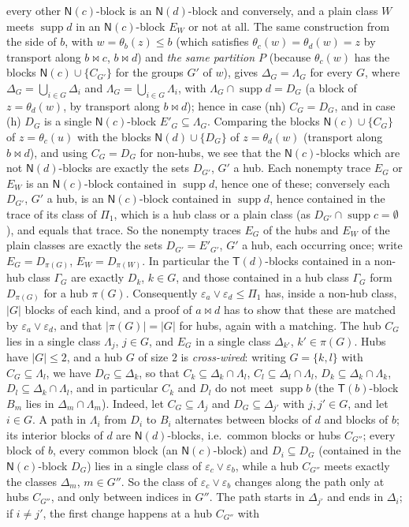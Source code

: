 \documentclass[11pt]{amsart}
\theoremstyle{definition}
\newcommand{\supp}{\operatorname{supp}}
\newcommand{\T}{\mathsf{T}}
\newcommand{\N}{\mathsf{N}}
\begin{document}
every other $\N(c)$-block is an $\N(d)$-block and conversely, and a plain class $W$ meets $\supp d$ in an $\N(c)$-block $E_W$ or not at all. The same construction from the side of $b$, with $w=\theta_b(z)\le b$ (which satisfies $\theta_c(w)=\theta_d(w)=z$ by transport along $b\bowtie c$, $b\bowtie d$) and \emph{the same partition $P$} (because $\theta_c(w)$ has the blocks $\N(c)\cup\{C_{G'}\}$ for the groups $G'$ of $w$), gives $\Delta_G=\Lambda_G$ for every $G$, where $\Delta_G=\bigcup_{i\in G}\Delta_i$ and $\Lambda_G=\bigcup_{i\in G}\Lambda_i$, with $\Lambda_G\cap\supp d=D_G$ (a block of $z=\theta_d(w)$, by transport along $b\bowtie d$); hence in case (nh) $C_G=D_G$, and in case (h) $D_G$ is a single $\N(c)$-block $E'_G\subseteq\Lambda_G$. Comparing the blocks $\N(c)\cup\{C_G\}$ of $z=\theta_c(u)$ with the blocks $\N(d)\cup\{D_G\}$ of $z=\theta_d(w)$ (transport along $b\bowtie d$), and using $C_G=D_G$ for non-hubs, we see that the $\N(c)$-blocks which are not $\N(d)$-blocks are exactly the sets $D_{G'}$, $G'$ a hub. Each nonempty trace $E_G$ or $E_W$ is an $\N(c)$-block contained in $\supp d$, hence one of these; conversely each $D_{G'}$, $G'$ a hub, is an $\N(c)$-block contained in $\supp d$, hence contained in the trace of its class of $\Pi_1$, which is a hub class or a plain class (as $D_{G'}\cap\supp c=\emptyset$), and equals that trace. So the nonempty traces $E_G$ of the hubs and $E_W$ of the plain classes are exactly the sets $D_{G'}=E'_{G'}$, $G'$ a hub, each occurring once; write $E_G=D_{\pi(G)}$, $E_W=D_{\pi(W)}$. In particular the $\T(d)$-blocks contained in a non-hub class $\Gamma_G$ are exactly $D_k$, $k\in G$, and those contained in a hub class $\Gamma_G$ form $D_{\pi(G)}$ for a hub $\pi(G)$. Consequently $\varepsilon_a\vee\varepsilon_d\le\Pi_1$ has, inside a non-hub class, $|G|$ blocks of each kind, and a proof of $a\bowtie d$ has to show that these are matched by $\varepsilon_a\vee\varepsilon_d$, and that $|\pi(G)|=|G|$ for hubs, again with a matching. The hub $C_G$ lies in a single class $\Lambda_j$, $j\in G$, and $E_G$ in a single class $\Delta_{k'}$, $k'\in\pi(G)$. Hubs have $|G|\le2$, and a hub $G$ of size $2$ is \emph{cross-wired}: writing $G=\{k,l\}$ with $C_G\subseteq\Lambda_l$, we have $D_G\subseteq\Delta_k$, so that $C_k\subseteq\Delta_k\cap\Lambda_l$, $C_l\subseteq\Delta_l\cap\Lambda_l$, $D_k\subseteq\Delta_k\cap\Lambda_k$, $D_l\subseteq\Delta_k\cap\Lambda_l$, and in particular $C_k$ and $D_l$ do not meet $\supp b$ (the $\T(b)$-block $B_m$ lies in $\Delta_m\cap\Lambda_m$). Indeed, let $C_G\subseteq\Lambda_j$ and $D_G\subseteq\Delta_{j'}$ with $j,j'\in G$, and let $i\in G$. A path in $\Lambda_i$ from $D_i$ to $B_i$ alternates between blocks of $d$ and blocks of $b$; its interior blocks of $d$ are $\N(d)$-blocks, i.e.\ common blocks or hubs $C_{G''}$; every block of $b$, every common block (an $\N(c)$-block) and $D_i\subseteq D_G$ (contained in the $\N(c)$-block $D_G$) lies in a single class of $\varepsilon_c\vee\varepsilon_b$, while a hub $C_{G''}$ meets exactly the classes $\Delta_m$, $m\in G''$. So the class of $\varepsilon_c\vee\varepsilon_b$ changes along the path only at hubs $C_{G''}$, and only between indices in $G''$. The path starts in $\Delta_{j'}$ and ends in $\Delta_i$; if $i\ne j'$, the first change happens at a hub $C_{G''}$ with 
\end{document}
